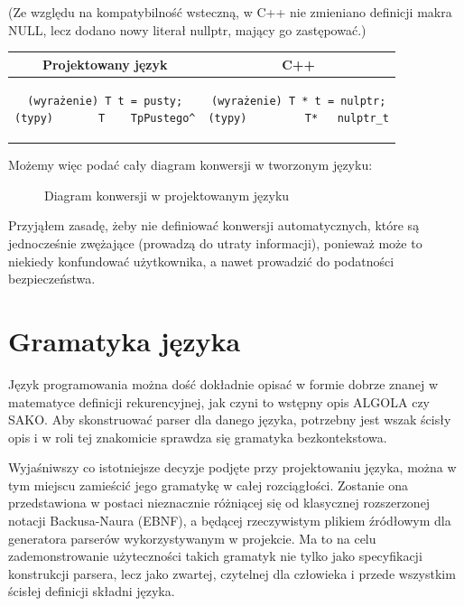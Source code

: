 (Ze względu na kompatybilność wsteczną, w C++ nie zmieniano definicji makra NULL, lecz dodano nowy literał nullptr, mający go zastępować.)
\begin{center}
\begin{tabular}{|c|c|}
\hline
\textbf{Projektowany język} & \textbf{C++} \\ \hline
\begin{lstlisting}
(wyrażenie) T t = pusty;
(typy)       T    TpPustego^
\end{lstlisting}
& 
\begin{lstlisting}
(wyrażenie) T * t = nulptr;
(typy)         T*   nulptr_t
\end{lstlisting} \\\hline
\end{tabular}
\end{center}

Możemy więc podać cały diagram konwersji w tworzonym języku:

\begin{figure}[h]
    \centering
    
    \caption{Diagram konwersji w projektowanym języku}
\end{figure}

Przyjąłem zasadę, żeby nie definiować konwersji automatycznych, które są jednocześnie zwężające (prowadzą do utraty informacji), ponieważ może to niekiedy konfundować użytkownika, a nawet prowadzić do podatności bezpieczeństwa\cite[str.~260]{Reversing}.

\section{Gramatyka języka}
\label{sect:gramatyka}
Język programowania można dość dokładnie opisać w formie dobrze znanej w matematyce definicji rekurencyjnej, jak czyni to wstępny opis ALGOLA\cite{ALGOL_PRELIMINARY_REPORT} czy SAKO\cite{SAKO}. Aby skonstruować parser dla danego języka, potrzebny jest wszak ścisły opis i w roli tej znakomicie sprawdza się gramatyka bezkontekstowa.

Wyjaśniwszy co istotniejsze decyzje podjęte przy projektowaniu języka, można w tym miejscu zamieścić jego gramatykę w całej rozciągłości.
Zostanie ona przedstawiona w postaci nieznacznie różniącej się od klasycznej rozszerzonej notacji Backusa-Naura (EBNF), a będącej rzeczywistym plikiem źródłowym dla generatora parserów wykorzystywanym w projekcie. Ma to na celu zademonstrowanie użyteczności takich gramatyk nie tylko jako specyfikacji konstrukcji parsera, lecz jako zwartej, czytelnej dla człowieka i przede wszystkim ścisłej definicji składni języka.

